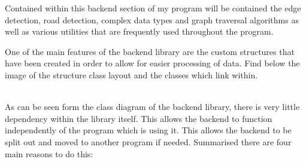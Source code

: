 \begin{FlushLeft}
    Contained within this backend section of my program will be contained the edge detection, road detection, complex data types and graph traversal algorithms as well as various utilities that are frequently used throughout the program. \\ \bk

    One of the main features of the backend library are the custom structures that have been created in order to allow for easier processing of data. Find below the image of the structure class layout and the classes which link within.\\

    \begin{figure}[H]
        \centering
    \end{figure}

    \\

    As can be seen form the class diagram of the backend library, there is very little dependency within the library itself. This allows the backend to function independently of the program which is using it. This allows the backend to be split out and moved to another program if needed. Summarised there are four main reasons to do this:


\end{FlushLeft}
